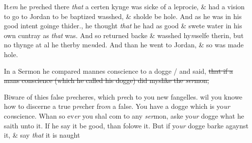 \documentclass[12pt, a4paper]{book}
\begin{document}
               	
               	
               		
				\marginpar[\vspace{0.5cm}{\textcolor{Gray}{pilgrimages}}]{}
			
               		
		\ifthenelse{\isodd{\thepage}}
		{\reversemarginpar}
		{\normalmarginpar}
		
               			It\textit{em} he p\textit{re}ched
               				there \textit{that} a certen kynge was sicke of a
               				leprocie, \& had a vision to go to Jordan to be baptized
               				wasshed, \& sholde be hole. And as he was in his good intent
               				goinge thider., he thought \textit{that} he had as good
               				\& swete water in his own cuntray as \textit{that} was.
               				And so returned backe \& wasshed hy\textit{m}selfe
               				therin, but no thynge at al he therby me\textit{n}ded. And
               				than he went to Jordan, \& so was made hole. 
			
               		
               	
               	
               		
			
               		
		\ifthenelse{\isodd{\thepage}}
		{\reversemarginpar}
		{\normalmarginpar}
		In a Sermon he compared mannes conscience to a dogge
               			/ and said, \sout{that
               				if a mans conscience (which he called his dogge) did myslike the
               				\textit{ser}mon,}
               	
               	
               		
		\ifthenelse{\isodd{\thepage}}
		{\reversemarginpar}
		{\normalmarginpar}
		Biware of thies false p\textit{re}cheres,
               			which p\textit{re}ch to you new fangelles. wil you knowe how
               			to discerne a true p\textit{re}cher fro\textit{m} a
               			false. You have a dogge which is yo\textit{ur}
               			co\textit{n}science. Whan so ev\textit{er} you shal
               			com to any \textit{ser}mon, aske yo\textit{ur} dogge
               			what he saith unto it. If he say it be good, than folowe it. But if
               			yo\textit{ur} dogge barke agaynst it, \& say
               			\textit{that} it is naught 
               	
\end{document}
